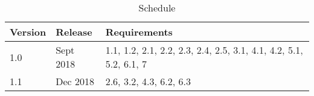 \begin{table}[hbt!]                    
  \centering
\begin{adjustbox}{max width=\textwidth}            
  \begin{tabular}{lll}                    
    \toprule          
      Version & 	Release	 & Requirements \\  \hline
1.0	& Sept 2018 &	1.1, 1.2, 2.1, 2.2, 2.3, 2.4, 2.5, 3.1, 4.1, 4.2, 5.1, 5.2, 6.1, 7\\  \hline
1.1	 & Dec 2018 &	2.6, 3.2, 4.3, 6.2, 6.3\\  \hline
                            
  \end{tabular}
\end{adjustbox}
  \caption{Schedule}             
  \label{tab:schedule}                 
\end{table}